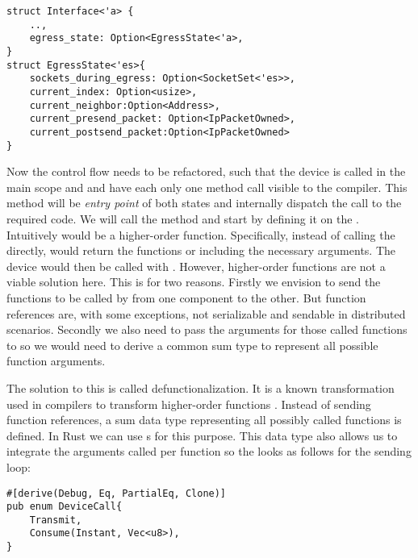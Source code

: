 
\begin{verbatim}
struct Interface<'a> {
    ..,
    egress_state: Option<EgressState<'a>,
}
struct EgressState<'es>{
    sockets_during_egress: Option<SocketSet<'es>>,
    current_index: Option<usize>,
    current_neighbor:Option<Address>,
    current_presend_packet: Option<IpPacketOwned>,
    current_postsend_packet:Option<IpPacketOwned>
}
\end{verbatim}

Now the control flow needs to be refactored, such that the device is called in the main scope and \dev{} and \stack{} have each only one method call visible to the compiler. This method will be \emph{entry point} of both states and internally dispatch the call to the required code. We will call the method  and start by defining it on the \dev{}. \\

Intuitively  would be a higher-order function. Specifically, instead of calling the \dev{} directly,  would return the functions  or  including the necessary arguments. The device would then be called with . However, higher-order functions are not a viable solution here. This is for two reasons. Firstly we envision to send the functions to be called by  from one component to the other. But function references are, with some exceptions, not serializable and sendable in distributed scenarios. Secondly we also need to pass the arguments for those called functions to  so we would need to derive a common sum type to represent all possible function arguments.

The solution to this is called defunctionalization. It is a known transformation used in compilers to transform higher-order functions \cite{reynolds1972definitional}. Instead of sending function references, a sum data type representing all possibly called functions is defined. In Rust we can use s for this purpose. This  data type also allows us to integrate the arguments called per function so the  looks as follows for the sending loop: 
\begin{verbatim}
#[derive(Debug, Eq, PartialEq, Clone)]
pub enum DeviceCall{
    Transmit,
    Consume(Instant, Vec<u8>),
}
\end{verbatim}

